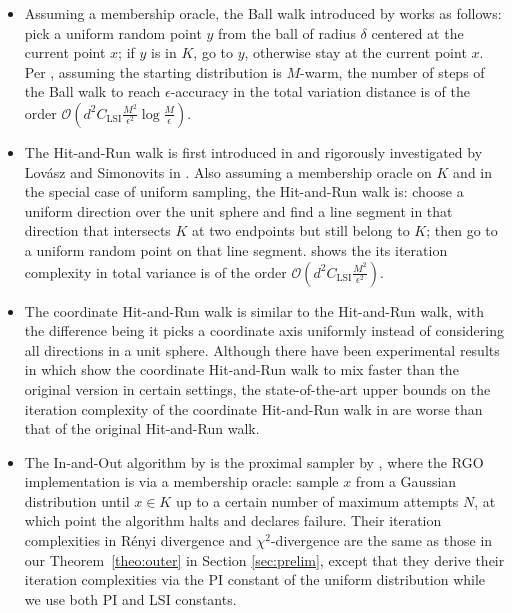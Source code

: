 \documentclass[11pt,letterpaper]{article}
\newcommand{\brac}[1]{\left( #1\right)}
\begin{document}
\begin{itemize}

\item Assuming a membership oracle, the Ball walk introduced by \cite{dyer1991random} works as follows: pick a uniform random point $y$ from the ball of radius $\delta$ centered at the
current point $x$; if $y$ is in $K$, go to $y$, otherwise stay at the current point $x$. Per \cite{lovasz1993random,vempala2005survey}, assuming the starting distribution is $M$-warm, the number of steps of the Ball walk to reach $\epsilon$-accuracy in the total variation distance is of the order $\mathcal{O}\brac{d^2 C_{\mathrm{LSI}}\frac{M^2}{\epsilon^2}\log\frac{M}{\epsilon} }$.


    \item The Hit-and-Run walk is first introduced in \cite{smith1984efficient} and rigorously investigated by Lov\'{a}sz and Simonovits in \cite{lovasz1993random}. Also assuming a membership oracle on $K$ and in the special case of uniform sampling, the Hit-and-Run walk is: choose a uniform direction over the unit sphere and find a line segment in that direction that intersects $K$ at two endpoints but still belong to $K$; then go to a uniform random point on that line segment. \cite{lovasz1999hit} shows the its iteration complexity in total variance is of the order $\mathcal{O}\brac{d^2C_{\mathrm{LSI}}\frac{M^2}{\epsilon^2}}$.
\item The coordinate Hit-and-Run walk \cite{turchin1971computation,diaconis2010gibbs,diaconis2012gibbs} is similar to the Hit-and-Run walk, with the difference being it picks a coordinate axis uniformly instead of considering all directions in a unit sphere. Although there have been experimental results in \cite{cousins2016practical,emiris2014efficient} which show the coordinate Hit-and-Run walk to mix faster than the original version in certain settings, the state-of-the-art upper bounds on the iteration complexity of the coordinate Hit-and-Run walk in \cite{laddha2023convergence,narayanan2022mixing} are worse than that of the original Hit-and-Run walk.  


\item The In-and-Out algorithm by \cite{kook2024inandout} is the proximal sampler by \cite{leestructured21}, where the RGO implementation is via a membership oracle: sample $x$ from a Gaussian distribution until $x\in K$ up to a certain number of maximum attempts $N$, at which point the algorithm halts and declares failure. Their iteration complexities in R\'{e}nyi divergence and $\chi^2$-divergence are the same as those in our Theorem~\ref{theo:outer} in Section \ref{sec:prelim}, except that they derive their iteration complexities via the PI constant of the uniform distribution while we use both PI and LSI constants. 
\end{itemize}
\end{document}
